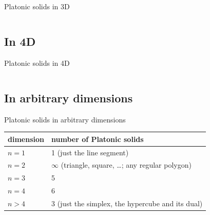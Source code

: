 \documentclass[12pt,compress,ngerman,utf8,t]{beamer}
\begin{document}
\begin{frame}{Platonic solids in 3D}
  \begin{columns}[c]
  \end{columns}
  \bigskip
  \begin{columns}[c]
  \end{columns}
\end{frame}


\subsection{In 4D}

\begin{frame}{Platonic solids in 4D}
  \begin{columns}[c]
  \end{columns}
  \bigskip
  \bigskip
  \begin{columns}[c]
  \end{columns}
\end{frame}


\subsection{In arbitrary dimensions}

\begin{frame}{Platonic solids in arbitrary dimensions}
  \centering
  \begin{tabular}{ll}
    \toprule
    dimension & number of Platonic solids \\ \midrule
    $n = 1$ & 1 (just the line segment) \\
    $n = 2$ & $\infty$ (triangle, square, \ldots; any regular polygon) \\
    $n = 3$ & 5 \\
    $n = 4$ & 6 \\
    $n > 4$ & 3 (just the simplex, the hypercube and its dual) \\
    \bottomrule
  \end{tabular}
  \par
\end{frame}
\end{document}
